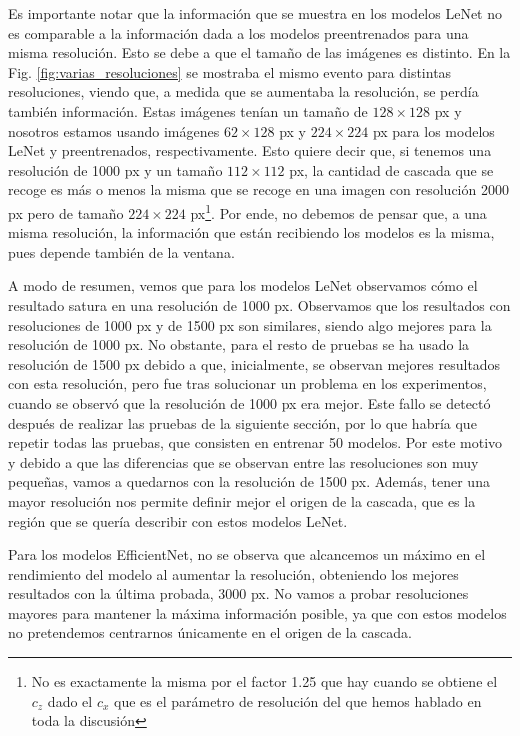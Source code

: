 \documentclass[a4paper,12pt,oneside,titlepage]{book}
\begin{document}
Es importante notar que la información que se muestra en los modelos LeNet no es comparable a la información dada a los modelos preentrenados para una misma resolución. Esto se debe a que el tamaño de las imágenes es distinto. En la Fig. \ref{fig:varias_resoluciones} se mostraba el mismo evento para distintas resoluciones, viendo que, a medida que se aumentaba la resolución, se perdía también información. Estas imágenes tenían un tamaño de $128\times128$ px y nosotros estamos usando imágenes $62\times128$ px y $224\times224$ px para los modelos LeNet y preentrenados, respectivamente. Esto quiere decir que, si tenemos una resolución de 1000 px y un tamaño $112\times112$ px, la cantidad de cascada que se recoge es más o menos la misma que se recoge en una imagen con resolución 2000 px pero de tamaño $224\times224$ px\footnote{No es exactamente la misma por el factor 1.25 que hay cuando se obtiene el $c_z$ dado el $c_x$ que es el parámetro de resolución del que hemos hablado en toda la discusión}. Por ende, no debemos de pensar que, a una misma resolución, la información que están recibiendo los modelos es la misma, pues depende también de la ventana.

A modo de resumen, vemos que para los modelos LeNet observamos cómo el resultado satura en una resolución de 1000 px. Observamos que los resultados con resoluciones de 1000 px y de 1500 px son similares, siendo algo mejores para la resolución de 1000 px. No obstante, para el resto de pruebas se ha usado la resolución de 1500 px debido a que, inicialmente, se observan mejores resultados con esta resolución, pero fue tras solucionar un problema en los experimentos, cuando se observó que la resolución de 1000 px era mejor. Este fallo se detectó después de realizar las pruebas de la siguiente sección, por lo que habría que repetir todas las pruebas, que consisten en entrenar 50 modelos. Por este motivo y debido a que las diferencias que se observan entre las resoluciones son muy pequeñas, vamos a quedarnos con la resolución de 1500 px. Además, tener una mayor resolución nos permite definir mejor el origen de la cascada, que es la región que se quería describir con estos modelos LeNet.  

Para los modelos EfficientNet, no se observa que alcancemos un máximo en el rendimiento del modelo al aumentar la resolución, obteniendo los mejores resultados con la última probada, 3000 px. No vamos a probar resoluciones mayores para mantener la máxima información posible, ya que con estos modelos no pretendemos centrarnos únicamente en el origen de la cascada.
\end{document}

